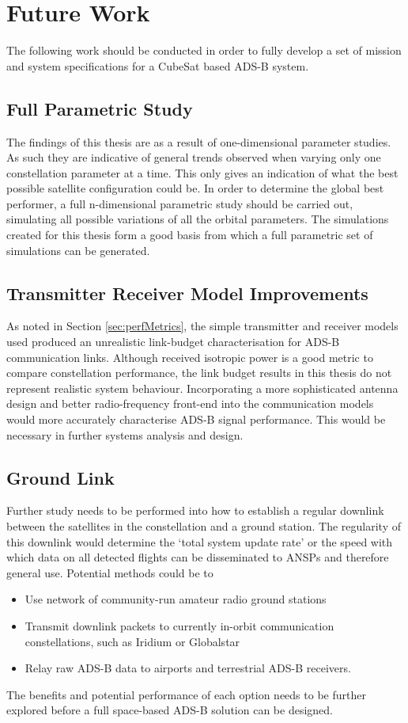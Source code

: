\section{Future Work}
The following work should be conducted in order to fully develop a set of mission and system specifications for a CubeSat based ADS-B system.
\subsection{Full Parametric Study}
The findings of this thesis are as a result of one-dimensional parameter studies. As such they are indicative of general trends observed when varying only one constellation parameter at a time. This only gives an indication of what the best possible satellite configuration could be. In order to determine the global best performer, a full n-dimensional parametric study should be carried out, simulating all possible variations of all the orbital parameters. The simulations created for this thesis form a good basis from which a full parametric set of simulations can be generated.

\subsection{Transmitter Receiver Model Improvements}
As noted in Section \ref{sec:perfMetrics}, the simple transmitter and receiver models used produced an unrealistic link-budget characterisation for ADS-B communication links. Although received isotropic power is a good metric to compare constellation performance, the link budget results in this thesis do not represent realistic system behaviour. Incorporating a more sophisticated antenna design and better radio-frequency front-end into the communication models would more accurately characterise ADS-B signal performance. This would be necessary in further systems analysis and design.

\subsection{Ground Link}
Further study needs to be performed into how to establish a regular downlink between the satellites in the constellation and a ground station. The regularity of this downlink would determine the `total system update rate' or the speed with which data on all detected flights can be disseminated to ANSPs and therefore general use. Potential methods could be to
\begin{itemize}
	\item Use network of community-run amateur radio ground stations
	\item Transmit downlink packets to currently in-orbit communication constellations, such as Iridium or Globalstar
	\item Relay raw ADS-B data to airports and terrestrial ADS-B receivers.
\end{itemize}
The benefits and potential performance of each option needs to be further explored before a full space-based ADS-B solution can be designed.
